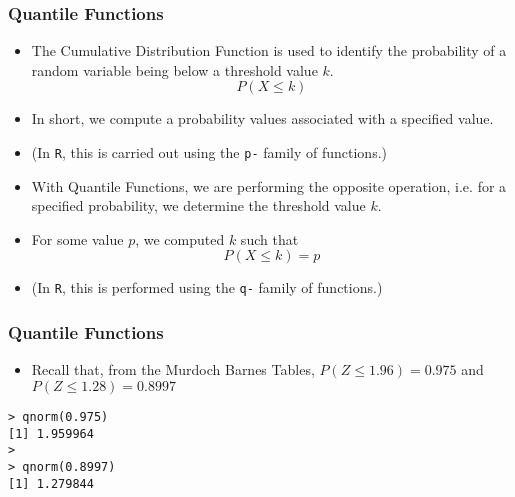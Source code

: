 \documentclass[a4]{beamer}
\begin{document}
\begin{frame}
\frametitle{Quantile Functions}
\begin{itemize} \item The Cumulative Distribution Function is used to identify the probability of a random variable being below a threshold value $k$.
\[P(X \leq k) \]

\item In short, we compute a probability values associated with a specified value.
\item (In \texttt{R}, this is carried out using the \texttt{p-} family of functions.)
\item With Quantile Functions, we are performing the opposite operation, i.e. for a specified probability, we determine the threshold value $k$.
\item For some value $p$, we computed $k$ such that
\[P(X \leq k) = p\]
\item (In \texttt{R}, this is performed using the \texttt{q-} family of functions.)
\end{itemize}

\end{frame}


\begin{frame}[fragile]
\frametitle{Quantile Functions}
\begin{itemize}
\item Recall that, from the Murdoch Barnes Tables, $P(Z \leq 1.96) = 0.975$ and $P(Z \leq 1.28) = 0.8997$
\end{itemize}
\begin{verbatim}
> qnorm(0.975)
[1] 1.959964
>
> qnorm(0.8997)
[1] 1.279844
\end{verbatim}
\end{frame}
\end{document}

